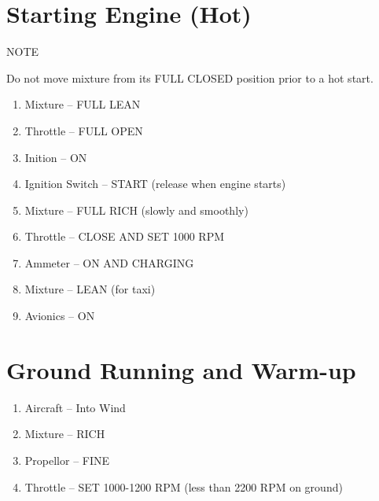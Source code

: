 \section{Starting Engine (Hot)}
\begin{center}
NOTE

Do not move mixture from its FULL CLOSED position prior to a hot start.
\end{center}
\begin{enumerate}
  \item Mixture -- FULL LEAN
  \item Throttle -- FULL OPEN
  \item Inition -- ON
  \item Ignition Switch -- START (release when engine starts)
  \item Mixture -- FULL RICH (slowly and smoothly)
  \item Throttle -- CLOSE AND SET 1000 RPM
  \item Ammeter -- ON AND CHARGING
  \item Mixture -- LEAN (for taxi)
  \item Avionics -- ON 
\end{enumerate}

\section{Ground Running and Warm-up}
\begin{enumerate}[(1)]
  \item Aircraft -- Into Wind
  \item Mixture -- RICH
  \item Propellor -- FINE
  \item Throttle -- SET 1000-1200 RPM (less than 2200 RPM on ground)
\end{enumerate} 



